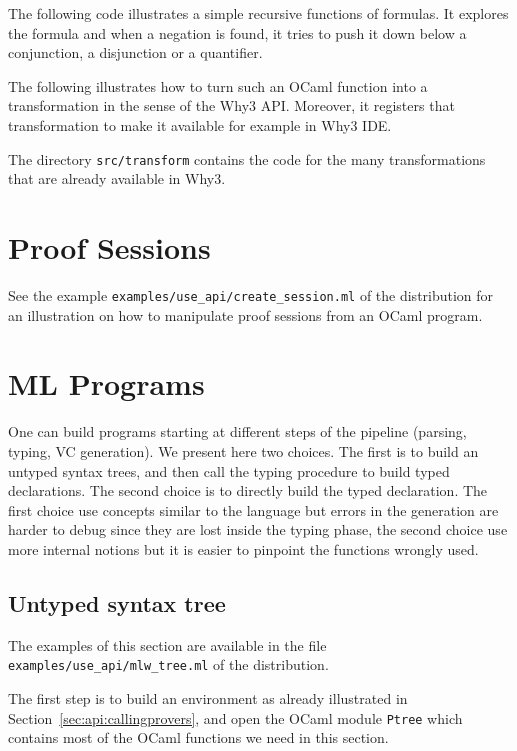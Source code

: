The following code illustrates a simple recursive functions of
formulas. It explores the formula and when a negation is found, it
tries to push it down below a conjunction, a disjunction or a
quantifier.


The following illustrates how to turn such an OCaml function into a
transformation in the sense of the Why3 API. Moreover, it registers that
transformation to make it available for example in Why3 IDE.


The directory \verb|src/transform| contains the code for the many
transformations that are already available in Why3.

\section{Proof Sessions}

See the example \verb|examples/use_api/create_session.ml| of the
distribution for an illustration on how to manipulate proof sessions
from an OCaml program.

\section{ML Programs}

One can build \whyml programs starting at different steps of the \whyml pipeline
(parsing, typing, VC generation). We present here two choices. The first is to build
an untyped syntax trees, and then
call the \why typing procedure to build typed declarations. The second choice is
to directly build the typed declaration. The first choice use concepts similar
to the \whyml language but errors in the generation are harder to debug since
they are lost inside the typing phase, the second choice use more internal
notions but it is easier to pinpoint the functions wrongly used.

\subsection{Untyped syntax tree}

The examples of this section are available in the file
\verb|examples/use_api/mlw_tree.ml| of the distribution.

The first step is to build an environment as already illustrated in
Section~\ref{sec:api:callingprovers}, and open the OCaml module
\verb|Ptree| which contains most of the OCaml functions we need in
this section.


